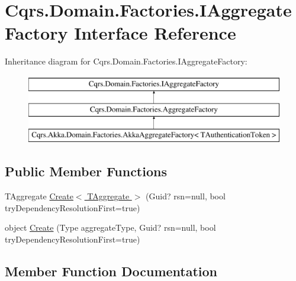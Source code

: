 \hypertarget{interfaceCqrs_1_1Domain_1_1Factories_1_1IAggregateFactory}{}\section{Cqrs.\+Domain.\+Factories.\+I\+Aggregate\+Factory Interface Reference}
\label{interfaceCqrs_1_1Domain_1_1Factories_1_1IAggregateFactory}
Inheritance diagram for Cqrs.\+Domain.\+Factories.\+I\+Aggregate\+Factory\+:\begin{figure}[H]
\begin{center}
\leavevmode
\includegraphics[height=3.000000cm]{interfaceCqrs_1_1Domain_1_1Factories_1_1IAggregateFactory}
\end{center}
\end{figure}
\subsection*{Public Member Functions}
\begin{DoxyCompactItemize}
\item 
T\+Aggregate \hyperlink{interfaceCqrs_1_1Domain_1_1Factories_1_1IAggregateFactory_a3dcbf8900e0d536da241e2e94f74cdd5}{Create$<$ T\+Aggregate $>$} (Guid? rsn=null, bool try\+Dependency\+Resolution\+First=true)
\item 
object \hyperlink{interfaceCqrs_1_1Domain_1_1Factories_1_1IAggregateFactory_ade388f0dfa9c42964392159a4f97fb1e}{Create} (Type aggregate\+Type, Guid? rsn=null, bool try\+Dependency\+Resolution\+First=true)
\end{DoxyCompactItemize}


\subsection{Member Function Documentation}
\mbox{\label{interfaceCqrs_1_1Domain_1_1Factories_1_1IAggregateFactory_ade388f0dfa9c42964392159a4f97fb1e}} 
